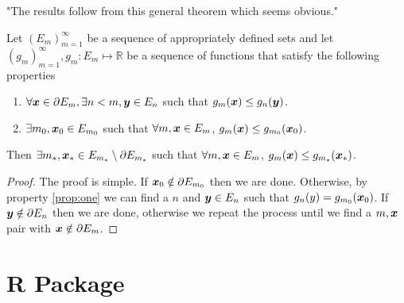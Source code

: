 

		"The results follow from this general theorem which seems obvious."

		\begin{theorem}
			\label{thm:solution in interior}
			Let $(E_m)_{m=1}^\infty$ be a sequence of appropriately defined sets and let
			$(g_m)_{m=1}^\infty, g_m: E_m \mapsto \mathbb{R}$ be a sequence of
			functions that satisfy the following properties
			\begin{enumerate}
				\item $\forall {\bm{{x}}} \in \partial E_m, \exists n < m, {\bm{{y}}} \in E_n$ such that
				$g_m({\bm{{x}}}) \leq g_n({\bm{{y}}})$.
				\label{prop:one}
				\item $\exists m_0, {\bm{{x}}}_0 \in E_{m_0}$ such that $\forall m, {\bm{{x}}} \in 
				E_m$, $g_m({\bm{{x}}}) \leq g_{m_0}({\bm{{x}}}_0)$.
			\end{enumerate}
			Then $\exists m_*, {\bm{{x}}}_* \in E_{m_*} \setminus \partial E_{m_*}$ such
			that $\forall m, {\bm{{x}}} \in E_m$, $g_m({\bm{{x}}}) \leq g_{m_*}({\bm{{x}}}_*)$.
		\end{theorem}
		\begin{proof}
			The proof is simple. If ${\bm{{x}}}_0 \notin \partial E_{m_0}$ then we are done.
			Otherwise, by property \ref{prop:one} we can find a $n$ and ${\bm{{y}}} \in 
			E_n$ such that $g_n(y) = g_{m_0}({\bm{{x}}}_0)$. If ${\bm{{y}}} \notin \partial 
			E_n$ then we are done, otherwise we repeat the process until we find a $m, 
			{\bm{{x}}}$ pair with ${\bm{{x}}} \notin \partial E_m$. %
		\end{proof}

\section{R Package}